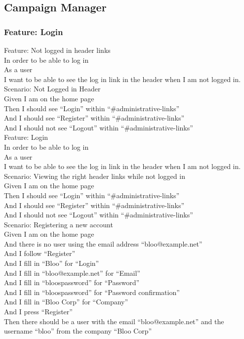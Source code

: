 \documentclass[12pt]{article}
\begin{document}
\subsection{Campaign Manager}

\subsubsection{Feature: Login}

Feature: Not logged in header links \\
In order to be able to log in \\
As a user \\
I want to be able to see the log in link in the header when I am not logged in. \\

Scenario: Not Logged in Header  \\
Given I am on the home page \\
Then I should see ``Login'' within ``\#administrative-links'' \\
And I should see ``Register'' within ``\#administrative-links'' \\
And I should not see ``Logout'' within ``\#administrative-links'' \\

Feature: Login \\
  In order to be able to log in \\
  As a user \\
  I want to be able to see the log in link in the header when I am not logged in. \\

Scenario: Viewing the right header links while not logged in  \\
  Given I am on the home page \\
  Then I should see ``Login'' within ``\#administrative-links'' \\
  And I should see ``Register'' within ``\#administrative-links'' \\
  And I should not see ``Logout'' within ``\#administrative-links'' \\


Scenario: Registering a new account \\
Given I am on the home page \\
And there is no user using the email address ``bloo@example.net'' \\
And I follow ``Register'' \\
And I fill in ``Bloo'' for ``Login'' \\
And I fill in ``bloo@example.net'' for ``Email'' \\
And I fill in ``bloospassword'' for ``Password'' \\
And I fill in ``bloospassword'' for ``Password confirmation'' \\
And I fill in ``Bloo Corp'' for ``Company'' \\
And I press ``Register'' \\
Then there should be a user with the email ``bloo@example.net'' and the username ``bloo'' from the company ``Bloo Corp'' \\
\end{document}

